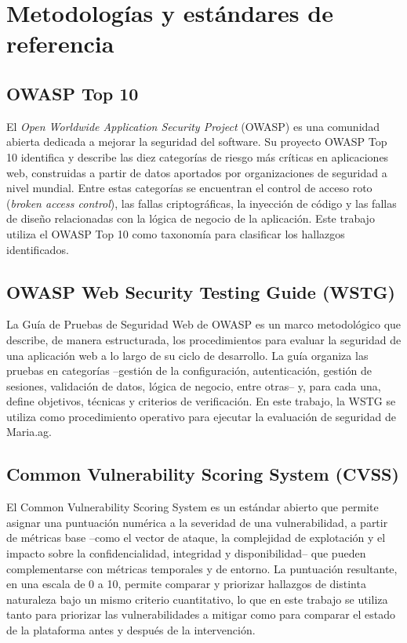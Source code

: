 \documentclass[12pt,letterpaper]{report}
\begin{document}
\section*{Metodologías y estándares de referencia}

\subsection*{OWASP Top 10}
El \textit{Open Worldwide Application Security Project} (OWASP) es una
comunidad abierta dedicada a mejorar la seguridad del software. Su proyecto
OWASP Top 10 \autocite{owasp2025top10} identifica y describe las diez
categorías de riesgo más críticas en aplicaciones web, construidas a partir de
datos aportados por organizaciones de seguridad a nivel mundial. Entre estas
categorías se encuentran el control de acceso roto (\textit{broken access
control}), las fallas criptográficas, la inyección de código y las fallas de
diseño relacionadas con la lógica de negocio de la aplicación. Este trabajo
utiliza el OWASP Top 10 como taxonomía para clasificar los hallazgos
identificados.

\subsection*{OWASP Web Security Testing Guide (WSTG)}
La Guía de Pruebas de Seguridad Web de OWASP \autocite{owasp2024wstg} es un
marco metodológico que describe, de manera estructurada, los procedimientos
para evaluar la seguridad de una aplicación web a lo largo de su ciclo de
desarrollo. La guía organiza las pruebas en categorías --gestión de la
configuración, autenticación, gestión de sesiones, validación de datos,
lógica de negocio, entre otras-- y, para cada una, define objetivos, técnicas
y criterios de verificación. En este trabajo, la WSTG se utiliza como
procedimiento operativo para ejecutar la evaluación de seguridad de
Maria.ag.

\subsection*{Common Vulnerability Scoring System (CVSS)}
El Common Vulnerability Scoring System \autocite{first2023cvss} es un
estándar abierto que permite asignar una puntuación numérica a la severidad
de una vulnerabilidad, a partir de métricas base --como el vector de ataque,
la complejidad de explotación y el impacto sobre la confidencialidad,
integridad y disponibilidad-- que pueden complementarse con métricas
temporales y de entorno. La puntuación resultante, en una escala de 0 a 10,
permite comparar y priorizar hallazgos de distinta naturaleza bajo un mismo
criterio cuantitativo, lo que en este trabajo se utiliza tanto para priorizar
las vulnerabilidades a mitigar como para comparar el estado de la plataforma
antes y después de la intervención.
\end{document}
